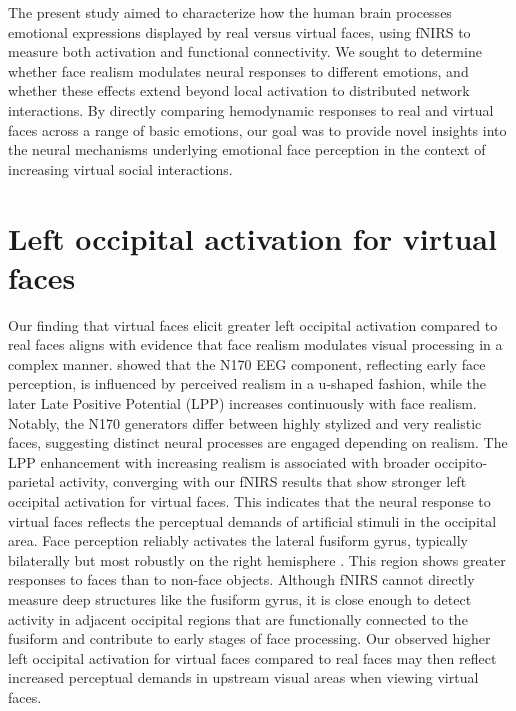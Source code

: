 The present study aimed to characterize how the human brain processes emotional expressions displayed by real versus virtual faces, using fNIRS to measure both activation and functional connectivity. 
We sought to determine whether face realism modulates neural responses to different emotions, and whether these effects extend beyond local activation to distributed network interactions. 
By directly comparing hemodynamic responses to real and virtual faces across a range of basic emotions, our goal was to provide novel insights into the neural mechanisms underlying emotional face perception in the context of increasing virtual social interactions.

\section{Left occipital activation for virtual faces}
Our finding that virtual faces elicit greater left occipital activation compared to real faces aligns with evidence that face realism modulates visual processing in a complex manner. 
\cite{schindler_differential_2017} showed that the N170 EEG component, reflecting early face perception, is influenced by perceived realism in a u-shaped fashion, while the later Late Positive Potential (LPP) increases continuously with face realism. 
Notably, the N170 generators differ between highly stylized and very realistic faces, suggesting distinct neural processes are engaged depending on realism. 
The LPP enhancement with increasing realism is associated with broader occipito-parietal activity, converging with our fNIRS results that show stronger left occipital activation for virtual faces.
This indicates that the neural response to virtual faces reflects the perceptual demands of artificial stimuli in the occipital area. 
Face perception reliably activates the lateral fusiform gyrus, typically bilaterally but most robustly on the right hemisphere \cite{haxby_distributed_2000}. 
This region shows greater responses to faces than to non-face objects. 
Although fNIRS cannot directly measure deep structures like the fusiform gyrus, it is close enough to detect activity in adjacent occipital regions that are functionally connected to the fusiform and contribute to early stages of face processing.
Our observed higher left occipital activation for virtual faces compared to real faces may then reflect increased perceptual demands in upstream visual areas when viewing virtual faces.


